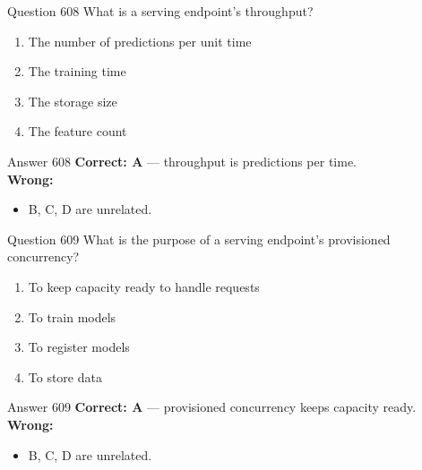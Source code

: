\documentclass[aspectratio=169,11pt]{beamer}
\begin{document}
	\begin{frame}{Question 608}
		What is a serving endpoint's throughput?
		\begin{enumerate}[label=\Alph*.]
			\item The number of predictions per unit time
			\item The training time
			\item The storage size
			\item The feature count
		\end{enumerate}
	\end{frame}
	\begin{frame}{Answer 608}
		\textbf{Correct: A} --- throughput is predictions per time.\\
		\vspace{0.5em}
		\textbf{Wrong:}
		\begin{itemize}
			\item B, C, D are unrelated.
		\end{itemize}
	\end{frame}
	
	\begin{frame}{Question 609}
		What is the purpose of a serving endpoint's provisioned concurrency?
		\begin{enumerate}[label=\Alph*.]
			\item To keep capacity ready to handle requests
			\item To train models
			\item To register models
			\item To store data
		\end{enumerate}
	\end{frame}
	\begin{frame}{Answer 609}
		\textbf{Correct: A} --- provisioned concurrency keeps capacity ready.\\
		\vspace{0.5em}
		\textbf{Wrong:}
		\begin{itemize}
			\item B, C, D are unrelated.
		\end{itemize}
	\end{frame}
	
\end{document}
